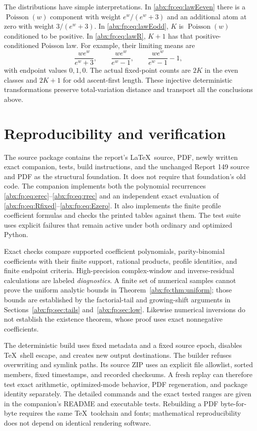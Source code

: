\documentclass[11pt,letterpaper]{article}
\numberwithin{equation}{section}
\theoremstyle{remark}\newtheorem{remark}[theorem]{Remark}
\DeclareMathOperator{\Poisson}{Poisson}
\begin{document}
The distributions have simple interpretations. In \eqref{abx:fp:eq:lawEeven}
there is a $\Poisson(w)$ component with weight $e^w/(e^w+3)$ and an
additional atom at zero with weight $3/(e^w+3)$. In
\eqref{abx:fp:eq:lawEodd}, $K$ is $\Poisson(w)$ conditioned to be positive.
In \eqref{abx:fp:eq:lawR}, $K+1$ has that positive-conditioned Poisson law.
For example, their limiting means are
\[
 \frac{we^w}{e^w+3},\qquad
 \frac{we^w}{e^w-1},\qquad
 \frac{we^w}{e^w-1}-1,
\]
with endpoint values $0,1,0$. The actual fixed-point counts are $2K$
in the even classes and $2K+1$ for odd ascent-first length. These
injective deterministic transformations preserve total-variation
distance and transport all the conclusions above.

\section{Reproducibility and verification}\label{abx:fp:sec:reproducibility}
The source package contains the report's \LaTeX\ source, PDF, newly
written exact companion, tests, build instructions, and the unchanged
Report 149 source and PDF as the structural foundation. It does not
require that foundation's old code. The companion implements both
the polynomial recurrences \eqref{abx:fp:eq:erec}--\eqref{abx:fp:eq:rrec} and an
independent exact evaluation of \eqref{abx:fp:eq:Rfixed}--\eqref{abx:fp:eq:Ezero}.
It also implements the finite profile coefficient formulas and checks
the printed tables against them. The test suite uses explicit failures
that remain active under both ordinary and optimized Python.

Exact checks compare supported coefficient polynomials, parity-binomial
coefficients with their finite support, rational products, profile
identities, and finite endpoint criteria. High-precision complex-window
and inverse-residual calculations are labeled \emph{diagnostics}.
A finite set of numerical samples cannot prove the uniform analytic
bounds in Theorem~\ref{abx:fp:thm:uniform}; those bounds are established by
the factorial-tail and growing-shift arguments in Sections~\ref{abx:fp:sec:tails} and~\ref{abx:fp:sec:low}.
Likewise numerical inversions do not establish the existence theorem,
whose proof uses exact nonnegative coefficients.

The deterministic build uses fixed metadata and a fixed source epoch,
disables \TeX\ shell escape, and creates new output destinations.
The builder refuses overwriting and symlink paths. Its source ZIP
uses an explicit file allowlist, sorted members, fixed timestamps,
and recorded checksums. A fresh replay can therefore test exact
arithmetic, optimized-mode behavior, PDF regeneration, and package
identity separately. The detailed commands and the exact tested ranges
are given in the companion's README and executable tests. Rebuilding
a PDF byte-for-byte requires the same \TeX\ toolchain and fonts;
mathematical reproducibility does not depend on identical rendering
software.
\end{document}
